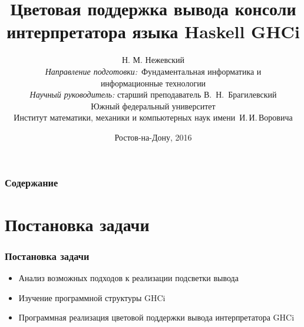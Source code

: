 \documentclass[utf8,russian]{beamer}
\title{\small{Цветовая поддержка вывода консоли интерпретатора языка Haskell GHCi}}
\author{\small{%
Н. М. Нежевский\\%
\emph{Направление подготовки:}~Фундаментальная информатика и \\информационные технологии\\%
\emph{Научный руководитель:} старший преподаватель В.~Н.~Брагилевский}\\%
\vspace{15pt}%
    Южный федеральный университет\\
    Институт математики, механики и компьютерных наук
    имени~И.\,И.\,Воровича%
}
\date{\small{Ростов-на-Дону, 2016}}
\begin{document}
\begin{frame}
\titlepage
\end{frame}

\begin{frame}
\frametitle{Содержание}
\tableofcontents
\end{frame}

\section{Постановка задачи}
\begin{frame}
\frametitle{Постановка задачи}
\begin{itemize}
  \item Анализ возможных подходов к реализации подсветки вывода
  \item Изучение программной структуры GHCi
  \item Программная реализация цветовой поддержки вывода интерпретатора GHCi
\end{itemize}
\end{frame}
\end{document}
